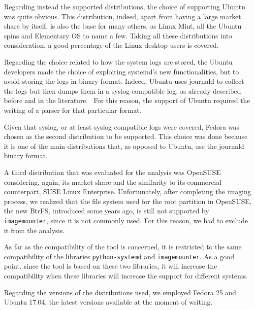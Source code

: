 \documentclass[a4paper]{article}
\begin{document}
Regarding instead the supported distributions, the choice of supporting Ubuntu
was quite obvious. This distribution, indeed, apart from having a large market
share by itself, is also the base for many others, as Linux Mint, all the Ubuntu
spins and Elementary OS to name a few. Taking all these distributions into
consideration, a good percentage of the Linux desktop users is covered.

Regarding the choice related to how the system logs are stored, the Ubuntu
developers made the choice of exploiting systemd's new functionalities, but to
avoid storing the logs in binary format. Indeed, Ubuntu uses journald to collect
the logs but then dumps them in a syslog compatible log, as already described
before and in the literature.~\cite{patil2016digital} For this reason, the
support of Ubuntu required the writing of a parser for that particular format.

Given that syslog, or at least syslog compatible logs were covered, Fedora was
chosen as the second distribution to be supported. This choice was done because
it is one of the main distributions that, as opposed to Ubuntu, use the
journald binary format.

A third distribution that was evaluated for the analysis was OpenSUSE
considering, again, its market share and the similarity to its commercial
counterpart, SUSE Linux Enterprise. Unfortunately, after completing the imaging
process, we realized that the file system used for the root partition in
OpenSUSE, the new BtrFS, introduced some years ago, is still not supported by
\texttt{imagemounter}, since it is not commonly used. For this reason, we had to
exclude it from the analysis.

As far as the compatibility of the tool is concerned, it is restricted to the
same compatibility of the libraries \texttt{python-systemd} and
\texttt{imagemounter}. As a good point, since the tool is based on these two
libraries, it will increase the compatibility when these libraries will increase
the support for different systems.

Regarding the versions of the distributions used, we employed Fedora 25 and
Ubuntu 17.04, the latest versions available at the moment of writing.
\end{document}
